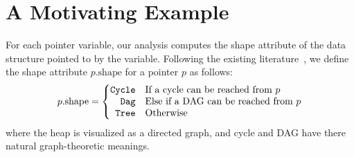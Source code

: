 \documentclass[runningheads,a4paper]{llncs}
\newcommand{\p}{\ensuremath{p}}
\newcommand{\shape}{\mbox{shape}}
\newcommand{\Tree}{{\tt Tree}}
\newcommand{\Dag}{{\tt Dag}}
\newcommand{\Cycle}{{\tt Cycle}}
\begin{document}
\section{A Motivating Example}\label{sec:motiv}

For each pointer variable, our analysis computes the shape
attribute of the data structure pointed to by the variable.
Following the existing
literature~\cite{Ghiya96,Sagiv96,Ghiya96practicaltechniques,marron06static}, we define the shape attribute $\p.\shape$
for a pointer $\p$ as follows:
\begin{eqnarray*}
  \p.\shape = \left\{ \begin{array}{@{}rl@{}}
    \Cycle & \mbox{If a cycle can be reached from $\p$} \\ 
    \Dag & \mbox{Else if a DAG can be reached from $\p$} \\
    \Tree & \mbox{Otherwise} \\
  \end{array} \right.
\end{eqnarray*}
where the heap is visualized as a directed graph, and cycle
and DAG have there natural graph-theoretic meanings.
\end{document}
